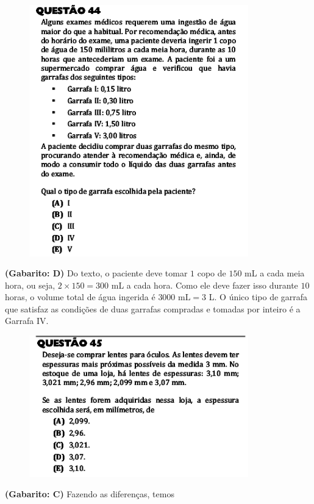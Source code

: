 \documentclass[a4paper]{article}
\begin{document}
\begin{figure}[H]
	\begin{center}
		\includegraphics[width=9.5cm]{L2Q44.png}
	\end{center}
\end{figure}
\par\textbf{(Gabarito: D)} Do texto, o paciente deve tomar $1$ copo de $150$ mL a cada meia hora, ou seja, $2\times 150 = 300$ mL a cada hora. Como ele deve fazer isso durante $10$ horas, o volume total de água ingerida é $3000\text{ mL} = 3$ L. O único tipo de garrafa que satisfaz as condições de duas garrafas compradas e tomadas por inteiro é a Garrafa IV.
\begin{figure}[H]
	\begin{center}
		\includegraphics[width=9.5cm]{L2Q45.png}
	\end{center}
\end{figure}
\par\textbf{(Gabarito: C)} Fazendo as diferenças, temos
\end{document}
